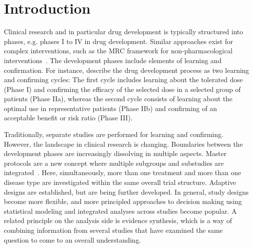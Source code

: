 \documentclass[bimj,fleqn]{w-art}
\theoremstyle{plain}
\theoremstyle{definition}
\begin{document}
\maketitle                   %







\section{Introduction}

Clinical research and in particular drug development is typically structured into phases, e.g. phases I to IV in drug development. 
Similar approaches exist for complex interventions, such as the MRC framework for non-pharmacological interventions~\citep{campbell_framework_2000}.
The development phases include elements of learning and confirmation.
For instance, \citet{sheiner_learning_1997} describe the drug development process as two learning and confirming cycles:
The first cycle includes learning about the tolerated dose (Phase I) and confirming the efficacy of the selected dose in a selected group of patients (Phase IIa), whereas the second cycle consists of learning about the optimal use in representative patients (Phase IIb) and confirming of an acceptable benefit or risk ratio (Phase III).

Traditionally, separate studies are performed for learning and confirming.
However, the landscape in clinical research is changing.
Boundaries between the development phases are increasingly dissolving in multiple aspects.
Master protocols are a new concept where multiple subgroups and substudies are integrated~\citep{bogin_master_2020}.
Here, simultaneously, more than one treatment and more than one disease type are investigated within the same overall trial structure.
Adaptive designs are established, but are being further developed.
In general, study designs become more flexible, and more principled approaches to decision making using statistical modeling and integrated analyses across studies become popular. 
A related principle on the analysis side is evidence synthesis, which is a way of combining information from several studies that have examined the same question to come to an overall understanding.
\end{document}

